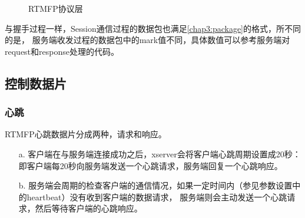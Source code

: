 \begin{small}
\begin{figure}[h]
\centering
{}
\caption{RTMFP协议层}\label{chap3:protocols}
\end{figure}
\end{small}

与握手过程一样，Session通信过程的数据包也满足\ref{chap3:package}的格式，所不同的是，
服务端收发过程的数据包中的mark值不同，具体数值可以参考服务端对request和response处理的代码。

\subsection{控制数据片}

\subsubsection{心跳}
RTMFP心跳数据片分成两种，请求和响应。
\begin{itemize}
    \item [a.] 客户端在与服务端连接成功之后，xserver会将客户端心跳周期设置成20秒：即客户端每20秒向服务端发送一个心跳请求，服务端回复一个心跳响应。
    \item [b.] 服务端会周期的检查客户端的通信情况，如果一定时间内（参见参数设置中的heartbeat）没有收到客户端的数据请求，
服务端则会主动发送一个心跳请求，然后等待客户端的心跳响应。
\end{itemize}

